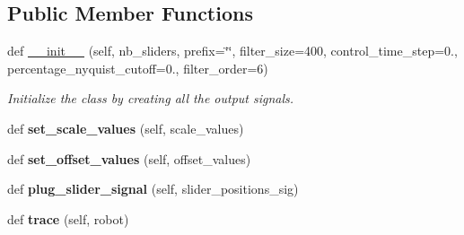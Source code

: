 \subsection*{Public Member Functions}
\begin{DoxyCompactItemize}
\item 
def \hyperlink{classpython_1_1dg__tools_1_1sliders_1_1Sliders_aba3e1ff7e60f21edd0049e4e049de8c8}{\+\_\+\+\_\+init\+\_\+\+\_\+} (self, nb\+\_\+sliders, prefix=\char`\"{}\char`\"{}, filter\+\_\+size=400, control\+\_\+time\+\_\+step=0., percentage\+\_\+nyquist\+\_\+cutoff=0., filter\+\_\+order=6)\hypertarget{classpython_1_1dg__tools_1_1sliders_1_1Sliders_aba3e1ff7e60f21edd0049e4e049de8c8}{}\label{classpython_1_1dg__tools_1_1sliders_1_1Sliders_aba3e1ff7e60f21edd0049e4e049de8c8}

\begin{DoxyCompactList}\small\item\em Initialize the class by creating all the output signals. \end{DoxyCompactList}\item 
def {\bfseries set\+\_\+scale\+\_\+values} (self, scale\+\_\+values)\hypertarget{classpython_1_1dg__tools_1_1sliders_1_1Sliders_a3c0363e583ad2e933888eb4a8cc5b460}{}\label{classpython_1_1dg__tools_1_1sliders_1_1Sliders_a3c0363e583ad2e933888eb4a8cc5b460}

\item 
def {\bfseries set\+\_\+offset\+\_\+values} (self, offset\+\_\+values)\hypertarget{classpython_1_1dg__tools_1_1sliders_1_1Sliders_ad61434524a1855f6b17e8cea010ac25b}{}\label{classpython_1_1dg__tools_1_1sliders_1_1Sliders_ad61434524a1855f6b17e8cea010ac25b}

\item 
def {\bfseries plug\+\_\+slider\+\_\+signal} (self, slider\+\_\+positions\+\_\+sig)\hypertarget{classpython_1_1dg__tools_1_1sliders_1_1Sliders_abf0a53cf4c323c1c1d40d325d7c60953}{}\label{classpython_1_1dg__tools_1_1sliders_1_1Sliders_abf0a53cf4c323c1c1d40d325d7c60953}

\item 
def {\bfseries trace} (self, robot)\hypertarget{classpython_1_1dg__tools_1_1sliders_1_1Sliders_a430660bca42dc72cf68fbc358ee6ba13}{}\label{classpython_1_1dg__tools_1_1sliders_1_1Sliders_a430660bca42dc72cf68fbc358ee6ba13}

\end{DoxyCompactItemize}
